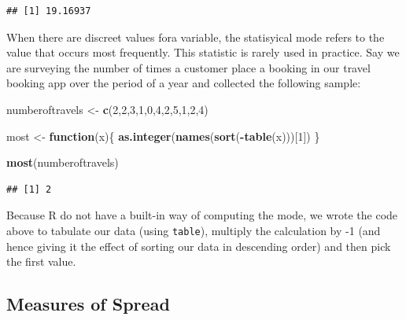 \documentclass[]{article}
\newenvironment{Shaded}{\begin{snugshade}}{\end{snugshade}}
\newcommand{\ControlFlowTok}[1]{\textcolor[rgb]{0.13,0.29,0.53}{\textbf{#1}}}
\newcommand{\DecValTok}[1]{\textcolor[rgb]{0.00,0.00,0.81}{#1}}
\newcommand{\KeywordTok}[1]{\textcolor[rgb]{0.13,0.29,0.53}{\textbf{#1}}}
\newcommand{\NormalTok}[1]{#1}
\newcommand{\OperatorTok}[1]{\textcolor[rgb]{0.81,0.36,0.00}{\textbf{#1}}}
\newcommand{\StringTok}[1]{\textcolor[rgb]{0.31,0.60,0.02}{#1}}
\begin{document}
\begin{verbatim}
## [1] 19.16937
\end{verbatim}

When there are discreet values fora variable, the statisyical mode
refers to the value that occurs most frequently. This statistic is
rarely used in practice. Say we are surveying the number of times a
customer place a booking in our travel booking app over the period of a
year and collected the following sample:

\begin{Shaded}
\begin{Highlighting}[]
\NormalTok{numberoftravels <-}\StringTok{ }\KeywordTok{c}\NormalTok{(}\DecValTok{2}\NormalTok{,}\DecValTok{2}\NormalTok{,}\DecValTok{3}\NormalTok{,}\DecValTok{1}\NormalTok{,}\DecValTok{0}\NormalTok{,}\DecValTok{4}\NormalTok{,}\DecValTok{2}\NormalTok{,}\DecValTok{5}\NormalTok{,}\DecValTok{1}\NormalTok{,}\DecValTok{2}\NormalTok{,}\DecValTok{4}\NormalTok{)}

\NormalTok{most <-}\StringTok{ }\ControlFlowTok{function}\NormalTok{(x)\{}
  \KeywordTok{as.integer}\NormalTok{(}\KeywordTok{names}\NormalTok{(}\KeywordTok{sort}\NormalTok{(}\OperatorTok{-}\KeywordTok{table}\NormalTok{(x)))[}\DecValTok{1}\NormalTok{])}
\NormalTok{\}}

\KeywordTok{most}\NormalTok{(numberoftravels)}
\end{Highlighting}
\end{Shaded}

\begin{verbatim}
## [1] 2
\end{verbatim}

Because R do not have a built-in way of computing the mode, we wrote the
code above to tabulate our data (using \texttt{table}), multiply the
calculation by -1 (and hence giving it the effect of sorting our data in
descending order) and then pick the first value.

\hypertarget{measures-of-spread}{%
\subsection{Measures of Spread}\label{measures-of-spread}}
\end{document}
